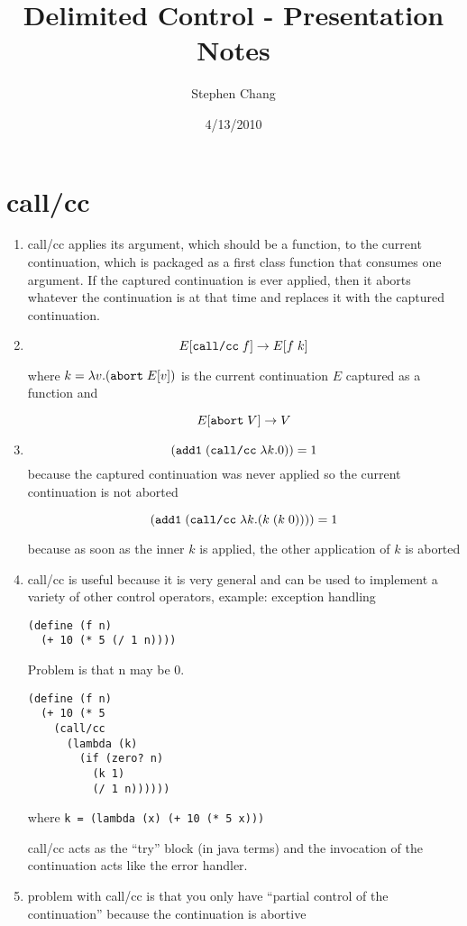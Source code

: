 \documentclass[letterpaper]{llncs}
\begin{document}

\title{Delimited Control - Presentation Notes}
\author{Stephen Chang}
\institute{}
\date{4/13/2010}
\maketitle

\section*{call/cc}
\begin{enumerate}
	\item call/cc applies its argument, which should be a function, to the current continuation, which is packaged as a first class function that consumes one argument. If the captured continuation is ever applied, then it aborts whatever the continuation is at that time and replaces it with the captured continuation.
	\item 
	$$ E[  \texttt{call/cc} \; f  ]  \rightarrow  E[  f \; k  ] $$
	
	where $k =  \lambda v.  (  \texttt{abort}  \;   E[v]   )   $ is the current continuation $E$ captured as a function and
	
	$$ E[   \texttt{abort}  \;  V   ]  \rightarrow V$$
	\item
	$$ (  \texttt{add1}  \;   ( \texttt{call/cc} \;   \lambda k.0   )   )  = 1$$
	because the captured continuation was never applied so the current continuation is not aborted
	
	$$ (  \texttt{add1}  \;   ( \texttt{call/cc} \;   \lambda k.  ( k \;  ( k \; 0 )  )     )   )  = 1$$
	
	because as soon as the inner $k$ is applied, the other application of $k$ is aborted
	
	\item call/cc is useful because it is very general and can be used to implement a variety of other control operators, example: exception handling
	
\begin{verbatim}
(define (f n)
  (+ 10 (* 5 (/ 1 n))))
\end{verbatim}

Problem is that n may be 0.

\begin{verbatim}
(define (f n)
  (+ 10 (* 5 
    (call/cc
      (lambda (k)
        (if (zero? n)
          (k 1)
          (/ 1 n))))))
\end{verbatim}

where \verb!k = (lambda (x) (+ 10 (* 5 x)))!

call/cc acts as the ``try'' block (in java terms) and the invocation of the continuation acts like the error handler.

	\item problem with call/cc is that you only have ``partial control of the continuation'' because the continuation is abortive~\cite{Felleisen1987SyntacticTheory}
\end{enumerate}
\end{document}
